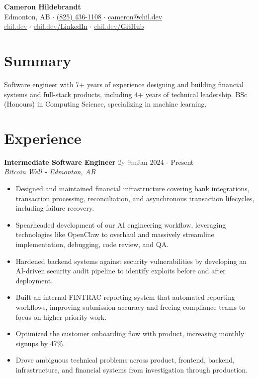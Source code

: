 \documentclass[10pt,letterpaper]{article}
\newcommand{\resumeHeading}[4]{\textbf{#1} \hfill \textcolor{gray}{\scriptsize #4}\hspace{0.35em}#3\\\textit{#2}}
\newcommand{\resumeFooting}[0]{\vspace{0.3em}}
\begin{document}
\begin{center}
    {\LARGE\bfseries Cameron Hildebrandt}\\[3pt]
    Edmonton, AB
    \enspace$\cdot$\enspace
    \href{tel:+18254361108}{(825) 436-1108}
    \enspace$\cdot$\enspace
    \href{mailto:cameron@chil.dev}{cameron@chil.dev}
    \\[2pt]
    \href{https://chil.dev}{\textcolor{gray}{chil.dev}}
    \enspace$\cdot$\enspace
    \href{https://chil.dev/linkedin}{\textcolor{gray}{chil.dev}/LinkedIn}
    \enspace$\cdot$\enspace
    \href{https://chil.dev/github}{\textcolor{gray}{chil.dev}/GitHub}
\end{center}

\raggedright

\section{Summary}

Software engineer with 7+ years of experience designing and building financial systems and full-stack products, including 4+ years of technical leadership. BSc (Honours) in Computing Science, specializing in machine learning.

\section{Experience}

\resumeHeading
{Intermediate Software Engineer}
{Bitcoin Well - Edmonton, AB}
{Jan 2024 - Present}
{2y 9m}

\begin{itemize}
\item Designed and maintained financial infrastructure covering bank integrations, transaction processing, reconciliation, and asynchronous transaction lifecycles, including failure recovery.
\item Spearheaded development of our AI engineering workflow, leveraging technologies like OpenClaw to overhaul and massively streamline implementation, debugging, code review, and QA.
\item Hardened backend systems against security vulnerabilities by developing an AI-driven security audit pipeline to identify exploits before and after deployment.
\item Built an internal FINTRAC reporting system that automated reporting workflows, improving submission accuracy and freeing compliance teams to focus on higher-priority work.
\item Optimized the customer onboarding flow with product, increasing monthly signups by 47\%.
\item Drove ambiguous technical problems across product, frontend, backend, infrastructure, and financial systems from investigation through production.
\end{itemize}
\resumeFooting{}
\end{document}
